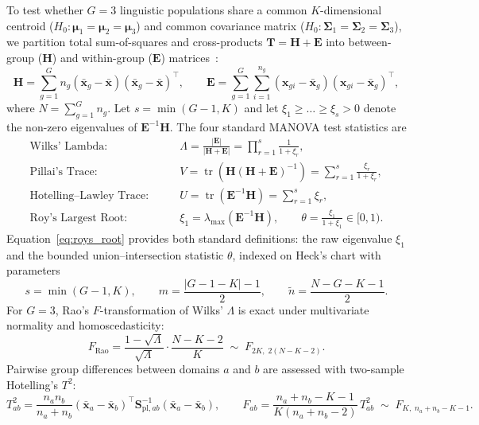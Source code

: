 \documentclass[12pt, a4paper, oneside]{report}
\theoremstyle{definition}
\newcommand{\vect}[1]{\mathbf{#1}}
\newcommand{\mat}[1]{\mathbf{#1}}
\newcommand{\tr}{\operatorname{tr}}
\begin{document}
To test whether $G = 3$ linguistic populations share a common $K$-dimensional centroid ($H_0 : \boldsymbol{\mu}_1 = \boldsymbol{\mu}_2 = \boldsymbol{\mu}_3$) and common covariance matrix ($H_0 : \mat{\Sigma}_1 = \mat{\Sigma}_2 = \mat{\Sigma}_3$), we partition total sum-of-squares and cross-products $\mat{T} = \mat{H} + \mat{E}$ into between-group ($\mat{H}$) and within-group ($\mat{E}$) matrices~\cite{hardle2019applied, rao1973linear}:
\begin{equation}
    \mat{H} = \sum_{g=1}^{G} n_g (\bar{\vect{x}}_g - \bar{\vect{x}})(\bar{\vect{x}}_g - \bar{\vect{x}})^\top,
    \qquad
    \mat{E} = \sum_{g=1}^{G}\sum_{i=1}^{n_g} (\vect{x}_{gi} - \bar{\vect{x}}_g)(\vect{x}_{gi} - \bar{\vect{x}}_g)^\top,
    \label{eq:manova_he}
\end{equation}
where $N = \sum_{g=1}^G n_g$. Let $s = \min(G - 1, K)$ and let $\xi_1 \ge \dots \ge \xi_s > 0$ denote the non-zero eigenvalues of $\mat{E}^{-1}\mat{H}$. The four standard MANOVA test statistics are
\begin{align}
    \text{Wilks' Lambda:} \qquad & \Lambda = \frac{|\mat{E}|}{|\mat{H} + \mat{E}|} = \prod_{r=1}^{s} \frac{1}{1 + \xi_r}, \label{eq:wilks} \\
    \text{Pillai's Trace:} \qquad & V = \tr\!\left(\mat{H}(\mat{H} + \mat{E})^{-1}\right) = \sum_{r=1}^{s} \frac{\xi_r}{1 + \xi_r}, \label{eq:pillai} \\
    \text{Hotelling--Lawley Trace:} \qquad & U = \tr(\mat{E}^{-1}\mat{H}) = \sum_{r=1}^{s} \xi_r, \label{eq:hl_trace} \\
    \text{Roy's Largest Root:} \qquad & \xi_1 = \lambda_{\max}(\mat{E}^{-1}\mat{H}), \qquad \theta = \frac{\xi_1}{1 + \xi_1} \in [0, 1). \label{eq:roys_root}
\end{align}
Equation~\eqref{eq:roys_root} provides both standard definitions: the raw eigenvalue $\xi_1$ and the bounded union--intersection statistic $\theta$, indexed on Heck's chart with parameters
\begin{equation}
    s = \min(G - 1, K),
    \qquad
    m = \frac{|G - 1 - K| - 1}{2},
    \qquad
    \tilde{n} = \frac{N - G - K - 1}{2}.
    \label{eq:heck_params}
\end{equation}
For $G = 3$, Rao's $F$-transformation of Wilks' $\Lambda$ is exact under multivariate normality and homoscedasticity:
\begin{equation}
    F_{\text{Rao}} = \frac{1 - \sqrt{\Lambda}}{\sqrt{\Lambda}} \cdot \frac{N - K - 2}{K} \;\sim\; F_{2K,\; 2(N - K - 2)}.
    \label{eq:rao_f}
\end{equation}
Pairwise group differences between domains $a$ and $b$ are assessed with two-sample Hotelling's $T^2$:
\begin{equation}
    T^2_{ab} = \frac{n_a n_b}{n_a + n_b}(\bar{\vect{x}}_a - \bar{\vect{x}}_b)^\top \mat{S}_{\text{pl},ab}^{-1} (\bar{\vect{x}}_a - \bar{\vect{x}}_b),
    \qquad
    F_{ab} = \frac{n_a + n_b - K - 1}{K(n_a + n_b - 2)}\,T^2_{ab} \;\sim\; F_{K,\; n_a + n_b - K - 1}.
    \label{eq:two_sample_t2}
\end{equation}
\end{document}

